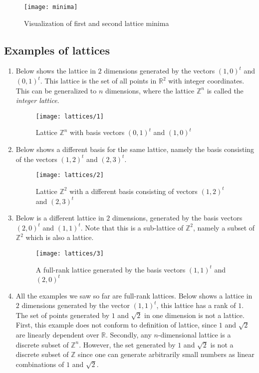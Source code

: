 \begin{figure}[H]
\texttt{[image: minima]}
\centering
\caption{Visualization of first and second lattice minima}
\end{figure} 

\subsection{Examples of lattices}
\begin{enumerate}
    \item Below shows the lattice in $2$ dimensions generated by the vectors $(1, 0)^t$ and $(0, 1)^t$. This lattice is the set of all points in $\mathbb{R}^2$ with integer coordinates. This can be generalized to $n$ dimensions, where the lattice $\mathbb{Z}^n$ is called the \textit{integer lattice}.
    
\begin{figure}[H]
\texttt{[image: lattices/1]}
\centering
\caption{Lattice $\mathbb{Z}^n$ with basis vectors $(0, 1)^t$ and $(1, 0)^t$}
\end{figure}    
    
    \item Below shows a different basis for the same lattice, namely the basis consisting of the vectors $(1, 2)^t$ and $(2, 3)^t$.
    
\begin{figure}[H]
\texttt{[image: lattices/2]}
\centering
\caption{Lattice $\mathbb{Z}^2$ with a different basis consisting of vectors
$(1, 2)^t$ and $(2, 3)^t$}
\end{figure}

    \item Below is a different lattice in $2$ dimensions, generated by the basis vectors $(2, 0)^t$ and $(1, 1)^t$. Note that this is a sub-lattice of $\mathbb{Z}^2$, namely a subset of $\mathbb{Z}^2$ which is also a lattice.
    

\begin{figure}[H]
\texttt{[image: lattices/3]}
\centering
\caption{A full-rank lattice generated by the basis vectors $(1, 1)^t$ and $(2, 0)^t$}
\end{figure}   
    
    \item All the examples we saw so far are full-rank lattices. Below shows a lattice in $2$ dimensions generated by the vector $(1, 1)^t$, this lattice has a rank of $1$. The set of points generated by ${1}$ and ${\sqrt{2}}$ in one dimension is not a lattice. First, this example does not conform to definition of lattice, since ${1}$ and ${\sqrt{2}}$ are linearly dependent over $\mathbb{R}$. Secondly, any $n$-dimensional lattice is a discrete subset of $\mathbb{Z}^n$. However, the set generated by ${1}$ and ${\sqrt{2}}$ is not a discrete subset of $\mathbb{Z}$ since one can generate arbitrarily small numbers as linear combinations of ${1}$ and ${\sqrt{2}}$.


\end{enumerate}
